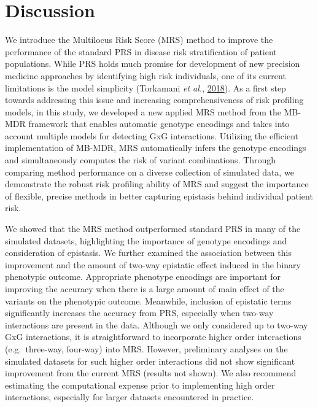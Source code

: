 \documentclass{ws-procs11x85}
\begin{document}
\hypertarget{discussion}{%
\section{Discussion}\label{discussion}}

We introduce the Multilocus Risk Score (MRS) method to improve the
performance of the standard PRS in disease risk stratification of
patient populations. While PRS holds much promise for development of new
precision medicine approaches by identifying high risk individuals, one of its current
limitations is the model simplicity (Torkamani \emph{et al.},
\protect\hyperlink{ref-1GK3F1BxE}{2018}). As a first step towards
addressing this issue and increasing comprehensiveness of risk profiling
models, in this study, we developed a new applied MRS method from the
MB-MDR framework that enables automatic genotype encodings and takes
into account multiple models for detecting GxG interactions. Utilizing
the efficient implementation of MB-MDR, MRS automatically infers the
genotype encodings and simultaneously computes the risk of variant
combinations. Through comparing method performance on a diverse
collection of simulated data, we demonstrate the robust risk
profiling ability of MRS and suggest the importance of flexible, precise
methods in better capturing epistasis behind individual patient risk.

We showed that the MRS method outperformed standard PRS in many of the
simulated datasets, highlighting the importance of genotype encodings
and consideration of epistasis. We further examined the association
between this improvement and the amount of two-way epistatic effect
induced in the binary phenotypic outcome. Appropriate phenotype
encodings are important for improving the accuracy when there is a large
amount of main effect of the variants on the phenotypic outcome.
Meanwhile, inclusion of epistatic terms significantly increases the
accuracy from PRS, especially when two-way interactions are present in
the data. Although we only considered up to two-way GxG interactions, it
is straightforward to incorporate higher order interactions
(e.g.~three-way, four-way) into MRS. However, preliminary analyses on
the simulated datasets for such higher order interactions did not show
significant improvement from the current MRS (results not shown). We
also recommend estimating the computational expense prior to
implementing high order interactions, especially for larger datasets
encountered in practice.
\end{document}
